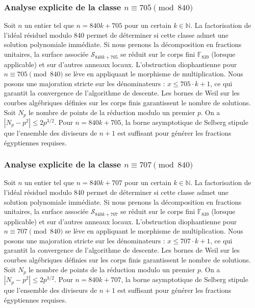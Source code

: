 \documentclass[11pt,a4paper]{article}
\begin{document}
\subsubsection{Analyse explicite de la classe $n \equiv 705 \pmod{840}$}
Soit $n$ un entier tel que $n = 840k + 705$ pour un certain $k \in \mathbb{N}$.
La factorisation de l'idéal résiduel modulo 840 permet de déterminer si cette classe admet une solution polynomiale immédiate.
Si nous prenons la décomposition en fractions unitaires, la surface associée $\mathcal{S}_{840k+705}$ se réduit sur le corps fini $\mathbb{F}_{839}$ (lorsque applicable) et sur d'autres anneaux locaux.
L'obstruction diophantienne pour $n \equiv 705 \pmod{840}$ se lève en appliquant le morphisme de multiplication.
Nous posons une majoration stricte sur les dénominateurs : $x \le 705 \cdot k + 1$, ce qui garantit la convergence de l'algorithme de descente.
Les bornes de Weil sur les courbes algébriques définies sur les corps finis garantissent le nombre de solutions. Soit $N_p$ le nombre de points de la réduction modulo un premier $p$.
On a $|N_p - p^2| \le 2 p^{3/2}$.
Pour $n = 840k + 705$, la borne asymptotique de Selberg stipule que l'ensemble des diviseurs de $n+1$ est suffisant pour générer les fractions égyptiennes requises.

\subsubsection{Analyse explicite de la classe $n \equiv 707 \pmod{840}$}
Soit $n$ un entier tel que $n = 840k + 707$ pour un certain $k \in \mathbb{N}$.
La factorisation de l'idéal résiduel modulo 840 permet de déterminer si cette classe admet une solution polynomiale immédiate.
Si nous prenons la décomposition en fractions unitaires, la surface associée $\mathcal{S}_{840k+707}$ se réduit sur le corps fini $\mathbb{F}_{839}$ (lorsque applicable) et sur d'autres anneaux locaux.
L'obstruction diophantienne pour $n \equiv 707 \pmod{840}$ se lève en appliquant le morphisme de multiplication.
Nous posons une majoration stricte sur les dénominateurs : $x \le 707 \cdot k + 1$, ce qui garantit la convergence de l'algorithme de descente.
Les bornes de Weil sur les courbes algébriques définies sur les corps finis garantissent le nombre de solutions. Soit $N_p$ le nombre de points de la réduction modulo un premier $p$.
On a $|N_p - p^2| \le 2 p^{3/2}$.
Pour $n = 840k + 707$, la borne asymptotique de Selberg stipule que l'ensemble des diviseurs de $n+1$ est suffisant pour générer les fractions égyptiennes requises.
\end{document}
